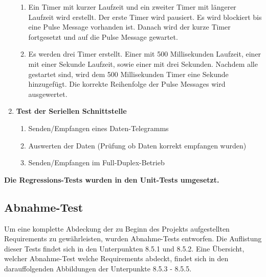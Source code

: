 \documentclass[oneside,a4paper,titlepage]{scrartcl}              %
\begin{document}
\begin{enumerate}
\begin{enumerate}
    \item Ein Timer mit kurzer Laufzeit und ein zweiter Timer mit längerer Laufzeit wird erstellt. Der erste Timer wird pausiert. Es wird blockiert bis eine Pulse Message vorhanden ist. Danach wird der kurze Timer fortgesetzt und auf die Pulse Message gewartet.
    \item Es werden drei Timer erstellt. Einer mit 500 Millisekunden Laufzeit, einer mit einer Sekunde Laufzeit, sowie einer mit drei Sekunden. Nachdem alle gestartet sind, wird dem 500 Millisekunden Timer eine Sekunde hinzugefügt. Die korrekte Reihenfolge der Pulse Messages wird ausgewertet.
  \end{enumerate}
  \item \textbf{Test der Seriellen Schnittstelle}
  \begin{enumerate}
    \item Senden/Empfangen eines Daten-Telegramms
    \item Auswerten der Daten (Prüfung ob Daten korrekt empfangen wurden)
    \item Senden/Empfangen im Full-Duplex-Betrieb
  \end{enumerate}
\end{enumerate}
\textbf{Die Regressions-Tests wurden in den Unit-Tests umgesetzt.}

\newpage

\subsection{Abnahme-Test}
Um eine komplette Abdeckung der zu Beginn des Projekts aufgestellten Requirements zu gewährleisten, wurden Abnahme-Tests entworfen.\newline
Die Auflistung dieser Tests findet sich in den Unterpunkten 8.5.1 und 8.5.2.\newline
Eine Übersicht, welcher Abnahme-Test welche Requirements abdeckt, findet sich in den darauffolgenden Abbildungen der Unterpunkte 8.5.3 - 8.5.5.

\end{document}
